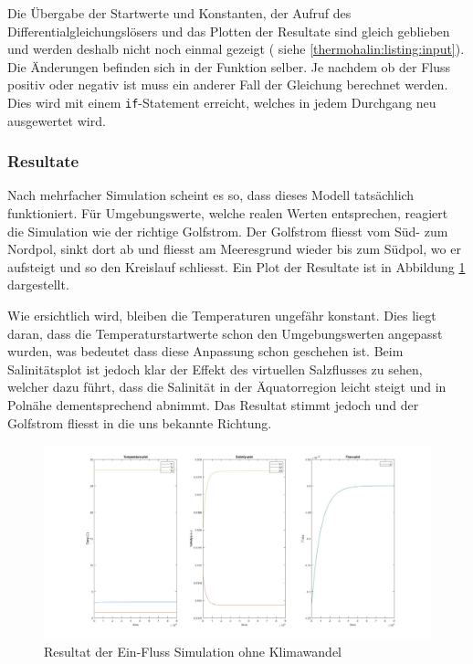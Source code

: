 Die Übergabe der Startwerte und Konstanten, der Aufruf des Differentialgleichungslösers und das Plotten der Resultate sind gleich geblieben und werden deshalb nicht noch einmal gezeigt ( siehe  \ref{thermohalin:listing:input}). Die Änderungen befinden sich in der Funktion selber. Je nachdem ob der Fluss positiv oder negativ ist muss ein anderer Fall der Gleichung berechnet werden. Dies wird mit einem \texttt{if}-Statement erreicht, welches in jedem Durchgang neu ausgewertet wird. 




\subsubsection{Resultate} 

Nach mehrfacher Simulation scheint es so, dass dieses Modell tatsächlich funktioniert. Für Umgebungswerte, welche realen Werten entsprechen, reagiert die Simulation wie der richtige Golfstrom. Der Golfstrom fliesst vom Süd- zum Nordpol, sinkt dort ab und fliesst am Meeresgrund wieder bis zum Südpol, wo er aufsteigt und so den Kreislauf schliesst. Ein Plot der Resultate ist in Abbildung \ref{thermohalin:3b1f-skript} dargestellt.

Wie ersichtlich wird, bleiben die Temperaturen ungefähr konstant. Dies liegt daran, dass die Temperaturstartwerte schon den Umgebungswerten angepasst wurden, was bedeutet dass diese Anpassung schon geschehen ist. Beim Salinitätsplot ist jedoch klar der Effekt des virtuellen Salzflusses zu sehen, welcher dazu führt, dass die Salinität in der Äquatorregion leicht steigt und in Polnähe dementsprechend abnimmt. Das Resultat stimmt jedoch und der Golfstrom fliesst in die uns bekannte Richtung.

\begin{figure}
	\centering
	\includegraphics[width=14cm]{thermohalin/Code/graphs/3b1f-skript.jpg}
	\caption{Resultat der Ein-Fluss Simulation ohne Klimawandel}
	\label{thermohalin:3b1f-skript}
\end{figure}

